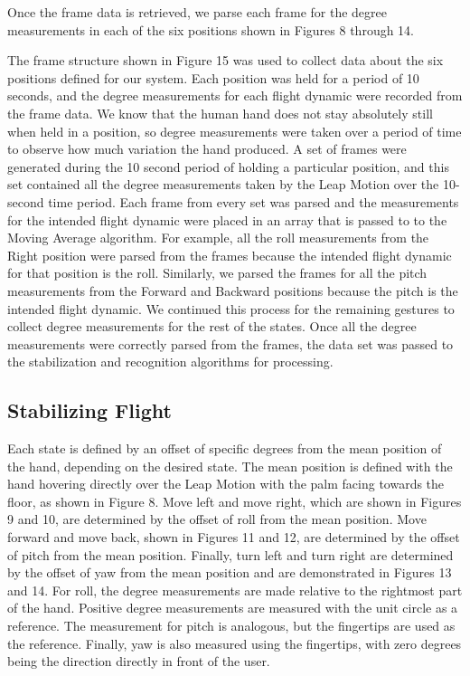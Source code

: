 \documentclass[letterpaper,english, 12pt]{article}
\begin{document}
Once the frame data is retrieved, we parse each frame for the degree measurements in each of the six positions shown in Figures 8 through 14.

The frame structure shown in Figure 15 was used to collect data about the six positions defined for our system. Each position was held for a period of 10 seconds, and the degree measurements for each flight dynamic were recorded from the frame data. We know that the human hand does not stay absolutely still when held in a position, so degree measurements were taken over a period of time to observe how much variation the hand produced. A set of frames were generated during the 10 second period of holding a particular position, and this set contained all the degree measurements taken by the Leap Motion over the 10-second time period. Each frame from every set was parsed and the measurements for the intended flight dynamic were placed in an array that is passed to to the Moving Average algorithm. For example,  all the roll measurements from the Right position were parsed from the frames because the intended flight dynamic for that position is the roll. Similarly, we parsed the frames for all the pitch measurements from the Forward and Backward positions because the pitch is the intended flight dynamic. We continued this process for the remaining gestures to collect degree measurements for the rest of the states. Once all the degree measurements were correctly parsed from the frames, the data set was passed to the stabilization and recognition algorithms for processing.


\subsection*{Stabilizing Flight}

Each state is defined by an offset of specific degrees from the mean position of the hand, depending on the desired state. The mean position is defined with the hand hovering directly over the Leap Motion with the palm facing towards the floor, as shown in Figure 8. Move left and move right, which are shown in Figures 9 and 10, are determined by the offset of roll from the mean position. Move forward and move back, shown in Figures 11 and 12,  are determined by the offset of pitch from the mean position. Finally, turn left and turn right are determined by the offset of yaw from the mean position and are demonstrated in Figures 13 and 14. For roll, the degree measurements are made relative to the rightmost part of the hand. Positive degree measurements are measured with the unit circle as a reference. The measurement for pitch is analogous, but the fingertips are used as the reference. Finally, yaw is also measured using the fingertips, with zero degrees being the direction directly in front of the user.
\end{document}
